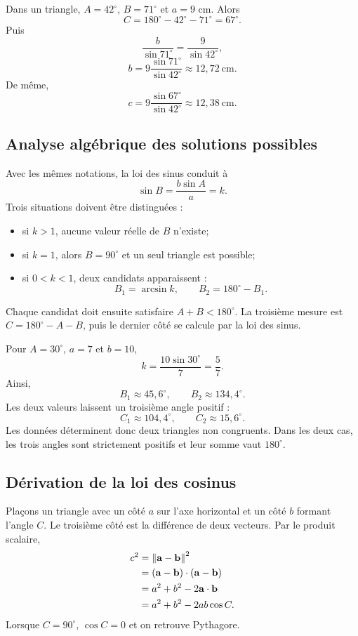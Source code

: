 \begin{examplebox}
Dans un triangle, $A=42^\circ$, $B=71^\circ$ et $a=9$ cm. Alors
\[
C=180^\circ-42^\circ-71^\circ=67^\circ.
\]
Puis
\[
\frac b{\sin71^\circ}=\frac9{\sin42^\circ},
\]
\[
b=9\frac{\sin71^\circ}{\sin42^\circ}\approx12{,}72\ \mathrm{cm}.
\]
De même,
\[
c=9\frac{\sin67^\circ}{\sin42^\circ}\approx12{,}38\ \mathrm{cm}.
\]
\end{examplebox}

\subsection{Analyse algébrique des solutions possibles}

Avec les mêmes notations, la loi des sinus conduit à
\[
\sin B=\frac{b\sin A}{a}=k.
\]
Trois situations doivent être distinguées :
\begin{itemize}
\item si $k>1$, aucune valeur réelle de $B$ n'existe;
\item si $k=1$, alors $B=90^\circ$ et un seul triangle est possible;
\item si $0<k<1$, deux candidats apparaissent :
\[
B_1=\arcsin k,
\qquad
B_2=180^\circ-B_1.
\]
\end{itemize}
Chaque candidat doit ensuite satisfaire $A+B<180^\circ$. La troisième mesure est $C=180^\circ-A-B$, puis le dernier côté se calcule par la loi des sinus.

\begin{examplebox}
Pour $A=30^\circ$, $a=7$ et $b=10$,
\[
k=\frac{10\sin30^\circ}{7}=\frac57.
\]
Ainsi,
\[
B_1\approx45{,}6^\circ,
\qquad
B_2\approx134{,}4^\circ.
\]
Les deux valeurs laissent un troisième angle positif :
\[
C_1\approx104{,}4^\circ,
\qquad
C_2\approx15{,}6^\circ.
\]
Les données déterminent donc deux triangles non congruents. Dans les deux cas, les trois angles sont strictement positifs et leur somme vaut $180^\circ$.
\end{examplebox}

\subsection{Dérivation de la loi des cosinus}

Plaçons un triangle avec un côté $a$ sur l'axe horizontal et un côté $b$ formant l'angle $C$. Le troisième côté est la différence de deux vecteurs. Par le produit scalaire,
\begin{align*}
c^2
&=\left\lVert \mathbf a-\mathbf b\right\rVert^2\\
&=(\mathbf a-\mathbf b)\cdot(\mathbf a-\mathbf b)\\
&=a^2+b^2-2\mathbf a\cdot\mathbf b\\
&=a^2+b^2-2ab\cos C.
\end{align*}
Lorsque $C=90^\circ$, $\cos C=0$ et on retrouve Pythagore.

